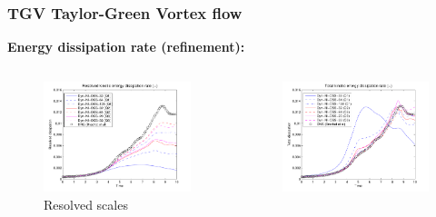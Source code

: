 \begin{frame}
 \frametitle{TGV {\small Taylor-Green Vortex flow}}
 \textbf{Energy dissipation rate (refinement):}
 \vspace*{-1.0cm}
 \begin{columns}
   \begin{column}{0.5\textwidth}
   \begin{figure}
     \centering	
     \includegraphics[width=1.1\textwidth]{Figures/ens_hp_10_new_resolved.pdf}
     \vspace*{-0.8cm}
     \caption{Resolved scales}
   \end{figure}
   \end{column}
   \begin{column}{0.5\textwidth}
   \begin{figure}
     \centering	
     \includegraphics[width=1.1\textwidth]{Figures/ens_hp_10_new_total.pdf}

\end{figure}
\end{column}
\end{columns}
\end{frame}
